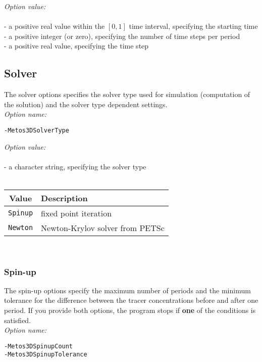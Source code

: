 \documentclass{article}
\begin{document}
\emph{Option value:} \\
\vspace{-0.3cm}\\
- a positive real value within the $[0, 1]$ time interval, specifying the starting time \\
- a positive integer (or zero), specifying the number of time steps per period \\
- a positive real value, specifying the time step \\

%
%
\subsection{Solver}
\label{Solver}

The solver options specifies the solver type used for simulation
(computation of the solution) and the solver type dependent settings. \\

\emph{Option name:}
\begin{verbatim}
-Metos3DSolverType
\end{verbatim}

\emph{Option value:} \\
\vspace{-0.3cm}\\
- a character string, specifying the solver type \\
\\
\begin{tabular}{c|l}
Value & Description \\ \hline
\texttt{Spinup} & fixed point iteration \\
\texttt{Newton} & Newton-Krylov solver from PETSc
\end{tabular} \\

\subsubsection{Spin-up}

The spin-up options specify the maximum number of periods
and the minimum tolerance for the difference between the
tracer concentrations before and after one period.
If you provide both options, the program stops if \textbf{one} of the conditions
is satisfied. \\

\emph{Option name:}
\begin{verbatim}
-Metos3DSpinupCount
-Metos3DSpinupTolerance
\end{verbatim}
\end{document}
